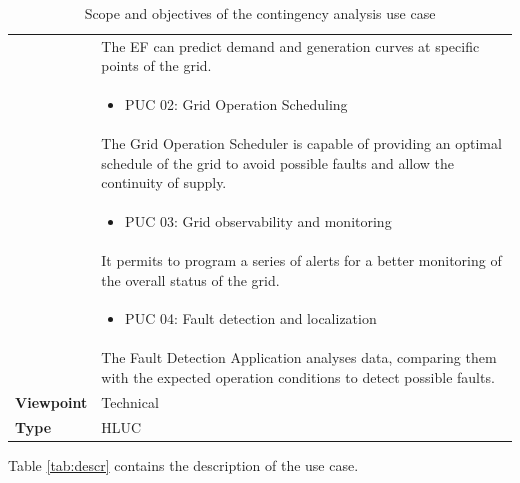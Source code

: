 \begin{table}[!htb]
\begin{tabularx}{\linewidth}{|l|L|}
                                     & \vspace{-1cm} The EF can predict demand and generation curves at specific points of the grid. \\
                                     & \begin{itemize} \item PUC 02: Grid Operation Scheduling \end{itemize} \\
                                     & \vspace{-1cm} The Grid Operation Scheduler is capable of providing an optimal schedule of the grid to avoid possible faults and allow the continuity of supply. \\
                                     & \begin{itemize} \item PUC 03: Grid observability and monitoring \end{itemize} \\
                                     & \vspace{-1cm} It permits to program a series of alerts for a better monitoring of the overall status of the grid. \\
                                     & \begin{itemize} \item PUC 04: Fault detection and localization \end{itemize} \\
                                     & \vspace{-1cm} The Fault Detection Application analyses data, comparing them with the expected operation conditions to detect possible faults. \\
    \hline
\textbf{Viewpoint} & Technical \\
\hline
\textbf{Type} & HLUC \\
\hline
\end{tabularx}
\caption{Scope and objectives of the contingency analysis use case}
\label{tab:scopee}
    \end{table}

Table \ref{tab:descr} contains the description of the use case.

